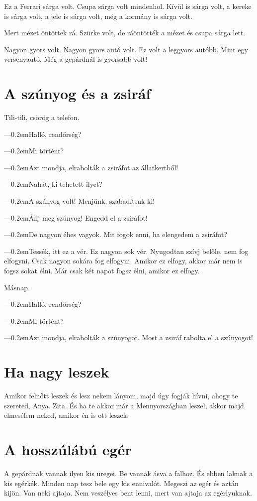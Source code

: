\documentclass[12pt]{memoir}
\def\dash{---\kern 0.2em}
\begin{document}
Ez a Ferrari sárga volt. Csupa sárga volt mindenhol. Kívül is sárga volt, a
kereke is sárga volt, a jele is sárga volt, még a kormány is sárga volt.

Mert mézet öntöttek rá. Szürke volt, de ráöntötték a mézet és csupa sárga lett.

Nagyon gyors volt. Nagyon gyors autó volt. Ez volt a leggyors autóbb. Mint egy
versenyautó. Még a gepárdnál is gyorsabb volt!
\cleartoverso


\section{A szúnyog és a zsiráf}
Tili-tili, csörög a telefon.

\dash Halló, rendőrség?

\dash Mi történt?

\dash Azt mondja, elrabolták a zsiráfot az állatkertből!

\dash Nahát, ki tehetett ilyet?

\dash A szúnyog volt! Menjünk, szabadítsuk ki!

\dash Állj meg szúnyog! Engedd el a zsiráfot!

\dash De nagyon éhes vagyok. Mit fogok enni, ha elengedem a zsiráfot?

\dash Tessék, itt ez a vér. Ez nagyon sok vér. Nyugodtan szívj belőle, nem fog
elfogyni. Csak nagyon sokára fog elfogyni. Amikor ez elfogy, akkor már nem is
fogsz sokat élni. Már csak két napot fogsz élni, amikor ez elfogy.

\bigskip

Másnap.

\dash Halló, rendőrség?

\dash Mi történt?

\dash Azt mondja, elrabolták a szúnyogot. Most a zsiráf rabolta el a szúnyogot!
\cleartoverso


\section{Ha nagy leszek}
Amikor felnőtt leszek és lesz nekem lányom, majd úgy fogják hívni, ahogy te
szereted, Anya. Zita. És ha te akkor már a Mennyországban leszel, akkor majd
elmesélem neked, amikor én is ott leszek.
\cleartoverso


\section{A hosszúlábú egér}
A gepárdnak vannak ilyen kis üregei. Be vannak ásva a falhoz. És ebben laknak a
kis egérkék. Minden nap tesz bele egy kis ennivalót. Megeszi az egér és aztán
kijön. Van neki ajtaja. Nem veszélyes bent lenni, mert van ajtaja az
egérlyuknak.
\end{document}
